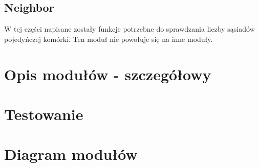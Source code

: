 \documentclass[a4paper]{article}
\begin{document}
\subsection{Neighbor}

\quad W tej cz\k{e}\'sci napisane zosta\l{}y funkcje potrzebne do sprawdzania liczby s\k{a}siad\'ow pojedy\'nczej kom\'orki.
Ten modu\l{} nie powo\l{}uje si\k{e} na inne modu\l{}y.

\section{Opis modu\l{}\'ow - szczeg\'o\l{}owy}


\section{Testowanie}


\section{Diagram modu\l{}\'ow}
\end{document}
